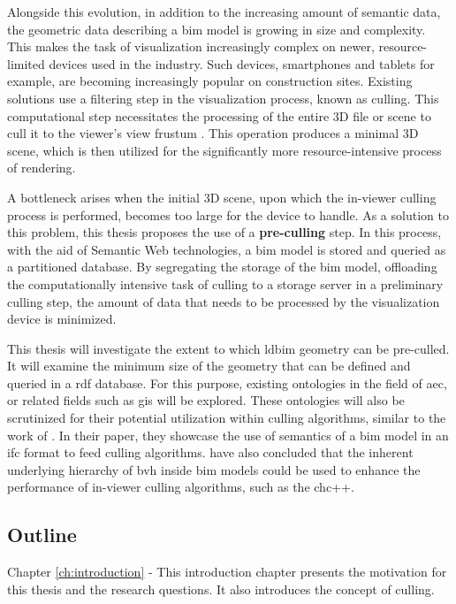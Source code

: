 \begin{refsection}
\begin{multicols}{2}
        Alongside this evolution, in addition to the increasing amount of semantic data, the geometric data describing a \ac{bim} model is growing in size and complexity. This makes the task of visualization increasingly complex on newer, resource-limited devices used in the industry. Such devices, smartphones and tablets for example, are becoming increasingly popular on construction sites. Existing solutions use a filtering step in the visualization process, known as culling. This computational step necessitates the processing of the entire 3D file or scene to cull it to the viewer's view frustum \parencite{Johansson2015}. This operation produces a minimal 3D scene, which is then utilized for the significantly more resource-intensive process of rendering.

        A bottleneck arises when the initial 3D scene, upon which the in-viewer culling process is performed, becomes too large for the device to handle. As a solution to this problem, this thesis proposes the use of a \textbf{pre-culling} step. In this process, with the aid of Semantic Web technologies, a \ac{bim} model is stored and queried as a partitioned database. By segregating the storage of the \ac{bim} model, offloading the computationally intensive task of culling to a storage server in a preliminary culling step, the amount of data that needs to be processed by the visualization device is minimized.

        This thesis will investigate the extent to which \ac{ldbim} geometry can be pre-culled. It will examine the minimum size of the geometry that can be defined and queried in a \ac{rdf} database. For this purpose, existing ontologies in the field of \ac{aec}, or related fields such as \ac{gis} will be explored. These ontologies will also be scrutinized for their potential utilization within culling algorithms, similar to the work of \cite{Johansson2009}. In their paper, they showcase the use of semantics of a \ac{bim} model in an \ac{ifc} format to feed culling algorithms. \cite{Johansson2015} have also concluded that the inherent underlying hierarchy of \ac{bvh} inside \ac{bim} models could be used to enhance the performance of in-viewer culling algorithms, such as the \ac{chc}++.

        \subsection*{Outline}
        \textsf{Chapter \ref{ch:introduction} -}
        This introduction chapter presents the motivation for this thesis and the research questions. It also introduces the concept of culling.


\end{multicols}
\end{refsection}
